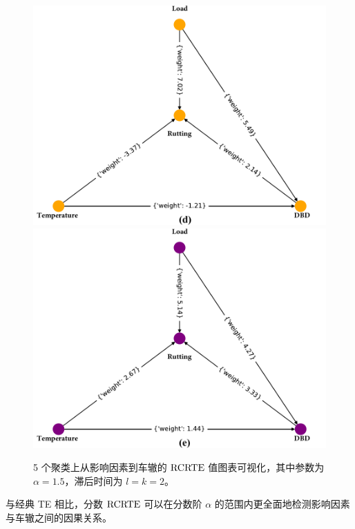 \begin{figure}[tbp]
\begin{center}
\includegraphics[scale=0.3]{./ch2/fig2_19.pdf}
\includegraphics[scale=0.3]{./ch2/fig2_20.pdf}
\caption{5 个聚类上从影响因素到车辙的 $\rm{RCRTE}$ 值图表可视化，其中参数为 $\alpha=1.5$，滞后时间为 $l=k=2$。} \label{fig8}
\end{center}
\end{figure}

与经典 TE 相比，分数 $\rm{RCRTE}$ 可以在分数阶 $\alpha$ 的范围内更全面地检测影响因素与车辙之间的因果关系。

